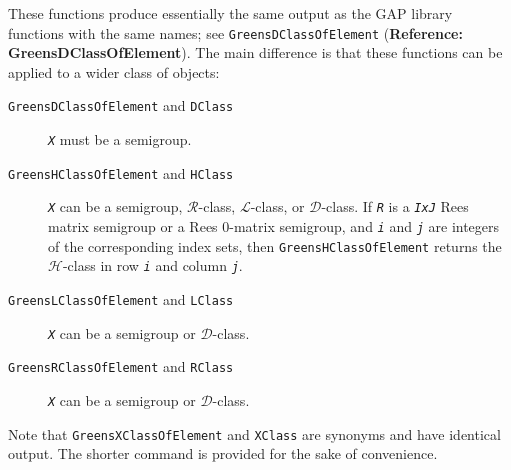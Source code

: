 \documentclass[a4paper,11pt]{report}
\begin{document}
{{{ These functions produce essentially the same output as the \textsf{GAP} library functions with the same names; see \texttt{GreensDClassOfElement} (\textbf{Reference: GreensDClassOfElement}). The main difference is that these functions can be applied to a wider class
of objects: 
\begin{description}
\item[{\texttt{GreensDClassOfElement} and \texttt{DClass}}]  \mbox{\texttt{\mdseries\slshape X}} must be a semigroup. 
\item[{\texttt{GreensHClassOfElement} and \texttt{HClass}}]  \mbox{\texttt{\mdseries\slshape X}} can be a semigroup, $\mathcal{R}$-class, $\mathcal{L}$-class, or $\mathcal{D}$-class.  If \mbox{\texttt{\mdseries\slshape R}} is a \mbox{\texttt{\mdseries\slshape IxJ}} Rees matrix semigroup or a Rees 0-matrix semigroup, and \mbox{\texttt{\mdseries\slshape i}} and \mbox{\texttt{\mdseries\slshape j}} are integers of the corresponding index sets, then \texttt{GreensHClassOfElement} returns the $\mathcal{H}$-class in row \mbox{\texttt{\mdseries\slshape i}} and column \mbox{\texttt{\mdseries\slshape j}}. 
\item[{\texttt{GreensLClassOfElement} and \texttt{LClass}}]  \mbox{\texttt{\mdseries\slshape X}} can be a semigroup or $\mathcal{D}$-class. 
\item[{\texttt{GreensRClassOfElement} and \texttt{RClass}}]  \mbox{\texttt{\mdseries\slshape X}} can be a semigroup or $\mathcal{D}$-class. 
\end{description}
 Note that \texttt{GreensXClassOfElement} and \texttt{XClass} are synonyms and have identical output. The shorter command is provided for
the sake of convenience.

 }

 
}}
\end{document}
